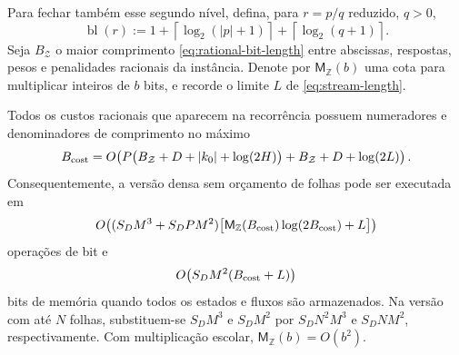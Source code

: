 Para fechar também esse segundo nível, defina, para $r=p/q$ reduzido, $q>0$,
\begin{equation}
 \operatorname{bl}(r)
 :=1+\left\lceil\log_2(|p|+1)\right\rceil
    +\left\lceil\log_2(q+1)\right\rceil .
 \label{eq:rational-bit-length}
\end{equation}
Seja $B_{\mathcal Z}$ o maior comprimento \eqref{eq:rational-bit-length}
entre abscissas, respostas, pesos e penalidades racionais da instância. Denote
por $\mathsf M_{\mathbb Z}(b)$ uma cota para multiplicar inteiros de $b$ bits,
e recorde o limite $L$ de \eqref{eq:stream-length}.

\begin{theorem}
\label{thm:bit-complexity}
Todos os custos racionais que aparecem na recorrência possuem numeradores e
denominadores de comprimento no máximo
\begin{equation}
 B_{\rm cost}
 =O\!\left(
 P\bigl(B_{\mathcal Z}+D+|k_0|+\log(2H)\bigr)
 +B_{\mathcal Z}+D+\log(2L)
 \right).
 \label{eq:cost-bit-growth}
\end{equation}
Consequentemente, a versão densa sem orçamento de folhas pode ser executada em
\begin{equation}
 O\!\left(
 (S_DM^3+S_DPM^2)
 \bigl[\mathsf M_{\mathbb Z}(B_{\rm cost})
       \log(2B_{\rm cost})+L\bigr]
 \right)
 \label{eq:dense-bit-time}
\end{equation}
operações de bit e
\begin{equation}
 O\!\left(S_DM^2(B_{\rm cost}+L)\right)
 \label{eq:dense-bit-memory}
\end{equation}
bits de memória quando todos os estados e fluxos são armazenados. Na versão
com até $N$ folhas, substituem-se $S_DM^3$ e $S_DM^2$ por
$S_DN^2M^3$ e $S_DNM^2$, respectivamente. Com multiplicação escolar,
$\mathsf M_{\mathbb Z}(b)=O(b^2)$.
\end{theorem}

